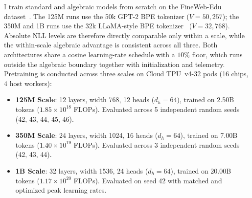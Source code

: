 \documentclass[11pt,a4paper]{article}
\theoremstyle{definition}
\begin{document}
I train standard and algebraic models from scratch on the FineWeb-Edu dataset~\citep{penedo2024fineweb}. The 125M runs use the 50k GPT-2 BPE tokenizer ($V=50{,}257$); the 350M and 1B runs use the 32k LLaMA-style BPE tokenizer~\citep{touvron2023llama} ($V=32{,}768$). Absolute NLL levels are therefore directly comparable only within a scale, while the within-scale algebraic advantage is consistent across all three. Both architectures share a cosine learning-rate schedule with a $10\%$ floor, which runs outside the algebraic boundary together with initialization and telemetry. Pretraining is conducted across three scales on Cloud TPU~v4-32 pods (16 chips, 4 host workers):
\begin{itemize}
    \item \textbf{125M Scale}: 12 layers, width 768, 12 heads ($d_h=64$), trained on 2.50B tokens ($1.85 \times 10^{18}$ FLOPs). Evaluated across 5 independent random seeds (42, 43, 44, 45, 46).
    \item \textbf{350M Scale}: 24 layers, width 1024, 16 heads ($d_h=64$), trained on 7.00B tokens ($1.40 \times 10^{19}$ FLOPs). Evaluated across 3 independent random seeds (42, 43, 44).
    \item \textbf{1B Scale}: 32 layers, width 1536, 24 heads ($d_h=64$), trained on 20.00B tokens ($1.17 \times 10^{20}$ FLOPs). Evaluated on seed 42 with matched and optimized peak learning rates.
\end{itemize}
\end{document}
